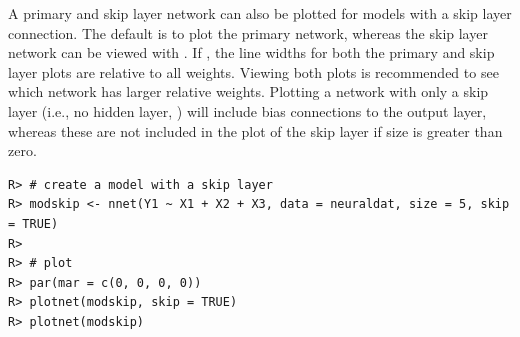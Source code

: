 \documentclass[article,shortnames]{jss}\usepackage[]{graphicx}\usepackage[]{color}
\makeatletter
\newenvironment{kframe}{%
 \def\at@end@of@kframe{}%
 \ifinner\ifhmode%
  \def\at@end@of@kframe{\end{minipage}}%
  \begin{minipage}{\columnwidth}%
 \fi\fi%
 \def\FrameCommand##1{\hskip\@totalleftmargin \hskip-\fboxsep
 \colorbox{shadecolor}{##1}\hskip-\fboxsep
     \hskip-\linewidth \hskip-\@totalleftmargin \hskip\columnwidth}%
 \MakeFramed {\advance\hsize-\width
   \@totalleftmargin\z@ \linewidth\hsize
   \@setminipage}}%
 {\par\unskip\endMakeFramed%
 \at@end@of@kframe}
\newenvironment{knitrout}{}{} %
\makeatother
\begin{document}
A primary and skip layer network can also be plotted for  models with a skip layer connection. The default is to plot the primary network, whereas the skip layer network can be viewed with . If , the line widths for both the primary and skip layer plots are relative to all weights. Viewing both plots is recommended to see which network has larger relative weights. Plotting a network with only a skip layer (i.e., no hidden layer, ) will include bias connections to the output layer, whereas these are not included in the plot of the skip layer if size is greater than zero.

\begin{knitrout}
\color{fgcolor}\begin{kframe}
\begin{verbatim}
R> # create a model with a skip layer
R> modskip <- nnet(Y1 ~ X1 + X2 + X3, data = neuraldat, size = 5, skip = TRUE)
R> 
R> # plot
R> par(mar = c(0, 0, 0, 0))
R> plotnet(modskip, skip = TRUE)
R> plotnet(modskip)
\end{verbatim}
\end{kframe}\begin{figure}[!ht]

{\centering {}

}
\end{figure}
\end{knitrout}
\end{document}

